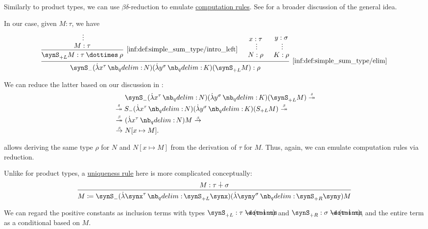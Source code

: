 \begin{remark}\label{rem:sum_type_equality_rules}
  Similarly to product types, we can use \( \beta\delta \)-reduction to emulate \hyperref[rem:type_theory_rule_classification/equality/comp]{computation rules}. See  for a broader discussion of the general idea.

  In our case, given \( M: \tau \), we have
  \begin{equation*}
    \begin{prooftree}
      \hypo{}
      \ellipsis {} { M: \tau }
      \infer1[\ref{inf:def:simple_sum_type/intro_left}]{ \synS_{+L} M: \tau \syntimes \rho }

      \hypo{ x: \tau }
      \ellipsis {} { N: \rho }

      \hypo{ y: \sigma }
      \ellipsis {} { K: \rho }

      \infer3[\ref{inf:def:simple_sum_type/elim}]{ \synS_- (\qabs {x^\tau} N) (\qabs {y^\sigma} K) (\synS_{+L} M): \rho }
    \end{prooftree}
  \end{equation*}

  We can reduce the latter based on our discussion in :
  \begin{align*}
    &\phantom{{}\bred*{}}
    \synS_- (\qabs {x^\tau} N) (\qabs {y^\sigma} K) (\synS_{+L} M)
    \dred* \\ &\dred*
    S_- (\qabs {x^\tau} N) (\qabs {y^\sigma} K) (S_{+L} M)
    \bred* \\ &\bred*
    (\qabs {x^\tau} N) M
    \bred \\ &\bred
    N[x \mapsto M].
  \end{align*}

   allows deriving the same type \( \rho \) for \( N \) and \( N[x \mapsto M] \) from the derivation of \( \tau \) for \( M \). Thus, again, we can emulate computation rules via reduction.

  Unlike for product types, a \hyperref[rem:type_theory_rule_classification/equality/uniq]{uniqueness rule} here is more complicated conceptually:
  \begin{equation*}
    \begin{prooftree}
      \hypo{ M: \tau \synplus \sigma }
      \infer1{ M \coloneqq \synS_- (\qabs {\synx^\tau} \synS_{+L} \synx) (\qabs {\syny^\sigma} \synS_{+R} \syny) M }
    \end{prooftree}
  \end{equation*}

  We can regard the positive constants as inclusion terms with types \( \synS_{+L}: \tau \synimplies (\tau \synplus \sigma) \) and \( \synS_{+R}: \sigma \synimplies (\tau \synplus \sigma) \), and the entire term as a conditional based on \( M \).
\end{remark}


